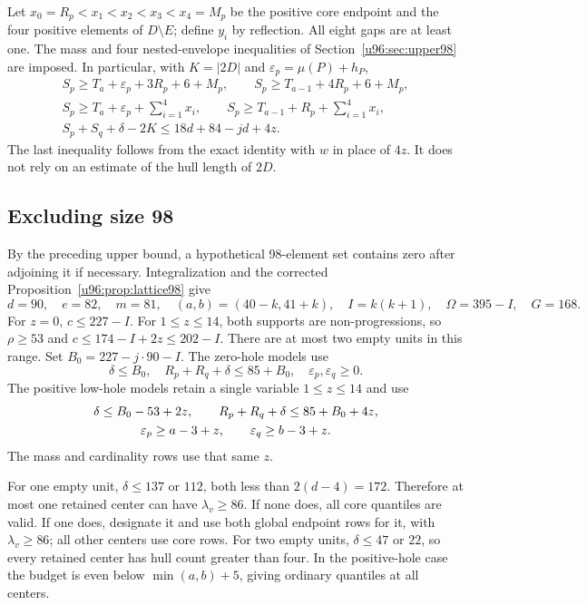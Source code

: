 \documentclass[11pt,a4paper]{article}
\theoremstyle{remark}
\begin{document}
Let $x_0=R_p<x_1<x_2<x_3<x_4=M_p$ be the positive core endpoint and the
four positive elements of $D\setminus E$; define $y_i$ by reflection.
All eight gaps are at least one. The mass and four nested-envelope
inequalities of Section~\ref{u96:sec:upper98} are imposed. In particular,
with $K=|2D|$ and $\varepsilon_p=\mu(P)+h_P$,
\begin{gather}
 S_p\geq T_a+\varepsilon_p+3R_p+6+M_p,\qquad
 S_p\geq T_{a-1}+4R_p+6+M_p,\label{u96:eq:mass96-short}\\
 S_p\geq T_a+\varepsilon_p+\sum_{i=1}^4x_i,\qquad
 S_p\geq T_{a-1}+R_p+\sum_{i=1}^4x_i,\label{u96:eq:mass96-full}\\
 S_p+S_q+\delta-2K\leq18d+84-jd+4z.
 \label{u96:eq:card96}
\end{gather}
The last inequality follows from the exact identity with $w$ in place
of $4z$. It does not rely on an estimate of the hull length of $2D$.

\subsection{Excluding size 98}
By the preceding upper bound, a hypothetical 98-element set contains
zero after adjoining it if necessary. Integralization and the corrected
Proposition~\ref{u96:prop:lattice98} give
\[
 d=90,\quad e=82,\quad m=81,\quad
 (a,b)=(40-k,41+k),\quad I=k(k+1),\quad
 \Omega=395-I,\quad G=168.
\]
For $z=0$, $c\leq227-I$. For $1\leq z\leq14$, both supports are
non-progressions, so $\rho\geq53$ and $c\leq174-I+2z\leq202-I$.
There are at most two empty units in this range. Set
$B_0=227-j\cdot90-I$. The zero-hole models use
\[
 \delta\leq B_0,\quad R_p+R_q+\delta\leq85+B_0,
 \quad \varepsilon_p,\varepsilon_q\geq0.
\]
The positive low-hole models retain a single variable $1\leq z\leq14$
and use
\begin{gather}
 \delta\leq B_0-53+2z,\qquad
 R_p+R_q+\delta\leq85+B_0+4z,\notag\\
 \varepsilon_p\geq a-3+z,\qquad
 \varepsilon_q\geq b-3+z.\label{u96:eq:low98}
\end{gather}
The mass and cardinality rows use that same $z$.

For one empty unit, $\delta\leq137$ or $112$, both less than
$2(d-4)=172$. Therefore at most one retained center can have
$\lambda_v\geq86$. If none does, all core quantiles are valid. If one
does, designate it and use both global endpoint rows for it, with
$\lambda_v\geq86$; all other centers use core rows.
For two empty units, $\delta\leq47$ or $22$, so every retained center
has hull count greater than four. In the positive-hole case the budget
is even below $\min(a,b)+5$, giving ordinary quantiles at all centers.
\end{document}
